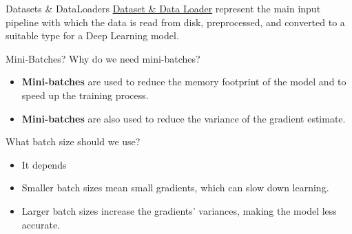 \documentclass{beamer}
\begin{document}
\begin{frame}[fragile]{Datasets \& DataLoaders}
    \href{https://pytorch.org/docs/stable/generated/torch.nn.Module.html}{Dataset \& Data Loader} represent the main input pipeline with which the data is read from disk, preprocessed, and converted to a suitable type for a Deep Learning model.\\
\end{frame}

\begin{frame}[fragile]{Mini-Batches?}
    Why do we need mini-batches? \\
    \begin{itemize}
        \item \textbf{Mini-batches} are used to reduce the memory footprint of the model and to speed up the training process.
        \item \textbf{Mini-batches} are also used to reduce the variance of the gradient estimate.
    \end{itemize}
    What batch size should we use? \\
    \begin{itemize}
        \item It depends
        \item Smaller batch sizes mean small gradients, which can slow down learning.
        \item Larger batch sizes increase the gradients' variances, making the model less accurate.
    \end{itemize}
\end{frame}
\end{document}
